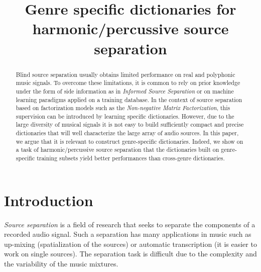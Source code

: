 \documentclass{article}
\title{Genre specific dictionaries for harmonic/percussive source separation}
\begin{document}
%
\maketitle
%


\begin{abstract}

Blind source separation usually obtains limited performance on real and polyphonic music signals. To overcome these limitations, it is common to rely on prior knowledge under the form of side information as in \emph{Informed Source Separation} or on machine learning paradigms applied on a training database. In the context of source separation based on factorization models such as the \emph{Non-negative Matrix Factorization}, this supervision can be introduced by learning specific dictionaries. However, due to the large diversity of musical signals it is not easy to build sufficiently compact and precise dictionaries that will well characterize the large array of audio sources. In this paper, we argue that it is relevant to construct genre-specific dictionaries. Indeed, we show on a task of harmonic/percussive source separation that the dictionaries built on genre-specific training subsets yield better performances than cross-genre dictionaries.



\end{abstract}
%
\section{Introduction}\label{sec:introduction}


\emph{Source separation} is a field of research that seeks to separate the components of a recorded audio signal. Such a separation has many applications in music such as up-mixing \cite{fitzgerald2011upmixing} (spatialization of the sources) or automatic transcription \cite{vincent2010adaptive} (it is easier to work on single sources). The separation task is difficult due to the complexity and the variability of the music mixtures. 
\end{document}

